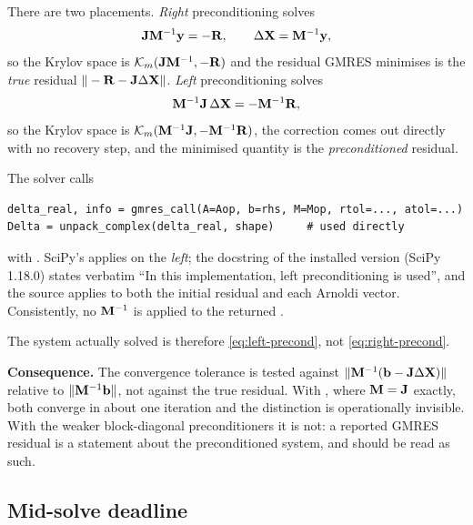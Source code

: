 There are two placements. \emph{Right} preconditioning solves
\begin{equation}
  \mathbf{J}\mathbf{M}^{-1}\mathbf{y} = -\mathbf{R},
  \qquad \Delta\mathbf{X} = \mathbf{M}^{-1}\mathbf{y},
  \label{eq:right-precond}
\end{equation}
so the Krylov space is $\mathcal{K}_m(\mathbf{J}\mathbf{M}^{-1}, -\mathbf{R})$ and the residual
GMRES minimises is the \emph{true} residual $\|-\mathbf{R}-\mathbf{J}\Delta\mathbf{X}\|$.
\emph{Left} preconditioning solves
\begin{equation}
  \mathbf{M}^{-1}\mathbf{J}\,\Delta\mathbf{X} = -\mathbf{M}^{-1}\mathbf{R},
  \label{eq:left-precond}
\end{equation}
so the Krylov space is $\mathcal{K}_m(\mathbf{M}^{-1}\mathbf{J}, -\mathbf{M}^{-1}\mathbf{R})$, the
correction comes out directly with no recovery step, and the minimised
quantity is the \emph{preconditioned} residual.

\begin{implnote}
\label{impl:left-precond}
The solver calls
\begin{lstlisting}
delta_real, info = gmres_call(A=Aop, b=rhs, M=Mop, rtol=..., atol=...)
Delta = unpack_complex(delta_real, shape)     # used directly
\end{lstlisting}
with . SciPy's  applies  on
the \emph{left}; the docstring of the installed version (SciPy 1.18.0) states
verbatim ``In this implementation, left preconditioning is used'', and the
source applies  to both the initial residual and each Arnoldi
vector. Consistently, no $\mathbf{M}^{-1}$ is applied to the returned
.

The system actually solved is therefore \eqref{eq:left-precond}, not
\eqref{eq:right-precond}.

\textbf{Consequence.} The convergence tolerance  is tested
against $\|\mathbf{M}^{-1}(\mathbf{b}-\mathbf{J}\Delta\mathbf{X})\|$ relative to
$\|\mathbf{M}^{-1}\mathbf{b}\|$, not against the true residual. With
, where $\mathbf{M}=\mathbf{J}$ exactly, both converge in about one
iteration and the distinction is operationally invisible. With the weaker
block-diagonal preconditioners it is not: a reported GMRES residual is a
statement about the preconditioned system, and should be read as such.
\end{implnote}

\subsection{Mid-solve deadline}

